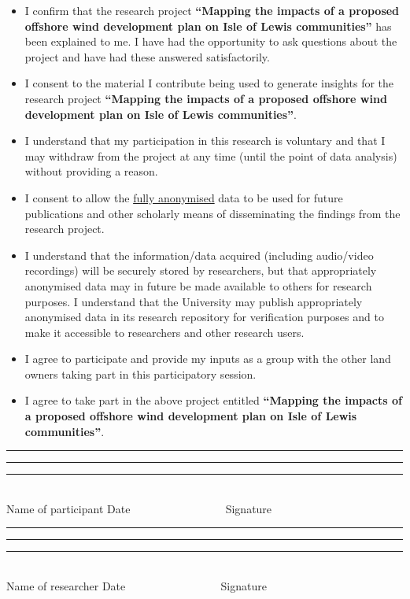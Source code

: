 {\begin{itemize}[label=]
  \item I confirm that the research project \textbf{``Mapping the impacts of a proposed offshore wind development plan on Isle of Lewis communities''} has been explained to me. I have had the opportunity to ask questions about the project and have had these answered satisfactorily.
  \item I consent to the material I contribute being used to generate insights for the research project \textbf{``Mapping the impacts of a proposed offshore wind development plan on Isle of Lewis communities''}.
  \item I understand that my participation in this research is voluntary and that I may withdraw from the project at any time (until the point of data analysis) without providing a reason.
  \item I consent to allow the \underline{fully anonymised} data to be used for future publications and other scholarly means of disseminating the findings from the research project.
  \item I understand that the information/data acquired (including audio/video recordings) will be securely stored by researchers, but that appropriately anonymised data may in future be made available to others for research purposes. I understand that the University may publish appropriately anonymised data in its research repository for verification purposes and to make it accessible to researchers and other research users.
  \item I agree to participate and provide my inputs as a group with the other land owners taking part in this participatory session.
  \item I agree to take part in the above project entitled \textbf{``Mapping the impacts of a proposed offshore wind development plan on Isle of Lewis communities''}.
\end{itemize}

\vspace{50pt}
\begin{center}
  \footnotesize
  \rule{100pt}{.5pt} \hfill \rule{100pt}{.5pt} \hfill \rule{100pt}{.5pt}\\
  Name of participant \hfill Date \hfill ~~~~~~~~~~~~~~~~ Signature \\[35pt]
  \rule{100pt}{.5pt} \hfill \rule{100pt}{.5pt} \hfill \rule{100pt}{.5pt}\\
  Name of researcher \hfill Date \hfill ~~~~~~~~~~~~~~~~ Signature
\end{center}
}
